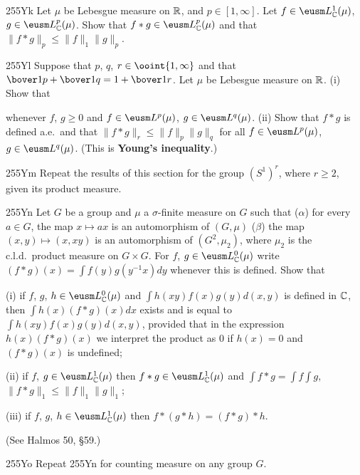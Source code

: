 {\spheader 255Yk Let $\mu$ be Lebesgue measure on $\Bbb R$, and
$p\in[1,\infty]$.   Let $f\in\eusm L^1_{\Bbb C}(\mu)$,
$g\in\eusm L^p_{\Bbb C}(\mu)$.   Show that
$f*g\in\eusm L^p_{\Bbb C}(\mu)$ and that
$\|f*g\|_p\le\|f\|_1\|g\|_p$.   

\spheader 255Yl Suppose that $p$, $q$, $r\in\ooint{1,\infty}$ and that
$\bover1p+\bover1q=1+\bover1r$.   Let $\mu$ be Lebesgue measure on
$\Bbb R$.   (i) Show that


\noindent whenever $f$, $g\ge 0$ and $f\in\eusm L^p(\mu)$,
$g\in\eusm L^q(\mu)$.      (ii)
Show that $f*g$ is defined a.e.\ and that
$\|f*g\|_r\le\|f\|_p\|g\|_q$ for all $f\in\eusm L^p(\mu)$,
$g\in\eusm L^q(\mu)$.   
(This is {\bf Young's inequality}.)

\spheader 255Ym Repeat the results of this section for the group
$(S^1)^r$, where $r\ge 2$, given its product measure.

\spheader 255Yn Let $G$ be a group and $\mu$ a
$\sigma$-finite measure on $G$ such that ($\alpha$) for every $a\in G$,
the map $x\mapsto ax$ is an automorphism of $(G,\mu)$ ($\beta$) the map
$(x,y)\mapsto (x,xy)$ is an automorphism of $(G^2,\mu_2)$, where $\mu_2$
is the c.l.d.\ product measure on $G\times G$.   For $f$,
$g\in\eusm L^0_{\Bbb C}(\mu)$ write $(f*g)(x)=\int f(y)g(y^{-1}x)dy$
whenever this is defined.   Show that

\quad (i) if $f$, $g$, $h\in\eusm L^0_{\Bbb C}(\mu)$ and $\int
h(xy)f(x)g(y)d(x,y)$ is defined in $\Bbb C$, then $\int h(x)(f*g)(x)dx$
exists and is equal to $\int h(xy)f(x)g(y)d(x,y)$, provided
that in the expression $h(x)(f*g)(x)$ we interpret the product as $0$ if
$h(x)=0$ and $(f*g)(x)$ is undefined;

\quad (ii) if $f$, $g\in\eusm L^1_{\Bbb C}(\mu)$ then $f*g\in\eusm
L^1_{\Bbb C}(\mu)$ and $\int f*g=\int f\int g$,
$\|f*g\|_1\le\|f\|_1\|g\|_1$;

\quad (iii) if $f$, $g$, $h\in\eusm L^1_{\Bbb C}(\mu)$ then
$f*(g*h)=(f*g)*h$.

\noindent (See {\smc Halmos 50}, \S59.)

\spheader 255Yo Repeat 255Yn for counting measure on any group $G$.
}%

